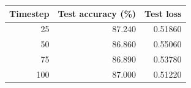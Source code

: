\begin{tabular}{rrr}
\toprule
Timestep & Test accuracy (\%) & Test loss \\
\midrule
25 & 87.240 & 0.51860 \\
50 & 86.860 & 0.55060 \\
75 & 86.890 & 0.53780 \\
100 & 87.000 & 0.51220 \\
\bottomrule
\end{tabular}
